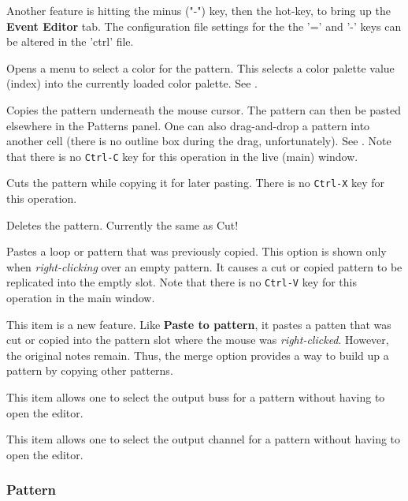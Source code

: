    Another feature is hitting the minus
   ("-") key, then the hot-key, to bring up the \textbf{Event Editor} tab.
   The configuration file settings for the the '=' and
   '-' keys can be altered in the 'ctrl' file.

   Opens a menu to select a color for the pattern.  This selects a color
   palette value (index) into the currently loaded color palette.
   See .

   Copies the pattern underneath the mouse cursor.
   The pattern can then be pasted elsewhere in the Patterns panel.
   One can also drag-and-drop a pattern into another cell (there is no outline
   box during the drag, unfortunately).
   See .
   Note that there is no \texttt{Ctrl-C} key for this operation in the
   live (main) window.

   Cuts the pattern while copying it for later pasting.
   There is no \texttt{Ctrl-X} key for this operation.

   Deletes the pattern.  Currently the same as Cut!

   Pastes a loop or pattern that was previously copied.
   This option is shown only when
   \textsl{right-clicking} over an empty pattern.
   It causes a cut or copied pattern to be replicated into the emptly slot.
   Note that there is no \texttt{Ctrl-V} key for this operation in the
   main window.

   This item is a new feature.  Like \textbf{Paste to pattern}, it pastes a
   patten that was cut or copied into the pattern slot where the mouse was
   \textsl{right-clicked}.  However, the original notes remain.  Thus, the merge
   option provides a way to build up a pattern by copying other patterns.

   This item allows one to select the output buss for a pattern without having
   to open the editor.

   This item allows one to select the output channel for a pattern without
   having to open the editor.
   
\subsubsection{Pattern}
\label{subsubsec:patterns_pattern_filled}

